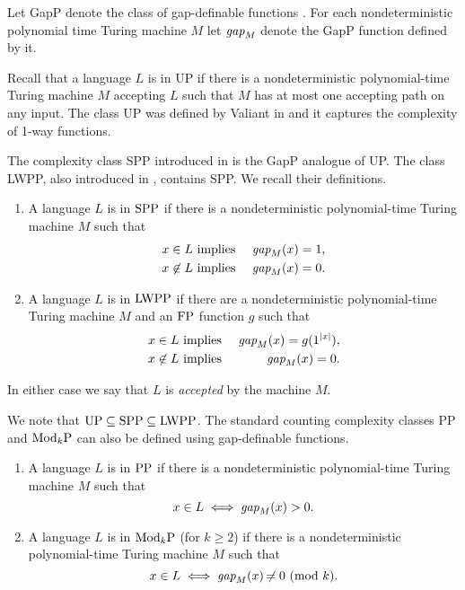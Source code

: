 \documentclass{elsart}
\newcommand{\UP}{\mbox{\rm UP}}
\newcommand{\PP}{\mbox{\rm PP}}
\newcommand{\FP}{\mbox{\rm FP}}
\newcommand{\ModkP}{\mbox{\rm Mod$_k$P}}
\newcommand{\LWPP}{\mbox{\rm LWPP}}
\newcommand{\SPP}{\mbox{\rm SPP}}
\newcommand{\gap}{\mbox{\it gap}}
\begin{document}
Let GapP denote the class of gap-definable functions
\cite{fenner91gapdefinable}. For each nondeterministic polynomial time
Turing machine $M$ let $\gap_M$ denote the GapP function defined by
it.

Recall that a language $L$ is in UP if there is a nondeterministic
polynomial-time Turing machine $M$ accepting $L$ such that $M$ has at
most one accepting path on any input. The class UP was defined by
Valiant in \cite{Val79} and it captures the complexity of 1-way
functions.

The complexity class SPP introduced in \cite{fenner91gapdefinable} is
the GapP analogue of UP. The class LWPP, also introduced in
\cite{fenner91gapdefinable}, contains SPP. We recall their
definitions.

\begin{defn}\mbox{}\label{sppdef}
\begin{enumerate}
\item A language $L$ is in $\SPP$ if there is a nondeterministic
  polynomial-time Turing machine $M$ such that
\begin{eqnarray*}
x\in L & \textrm{ implies } & \gap_M(x)=1,\\
x\not\in L & \textrm{ implies } & \gap_M(x)=0.
\end{eqnarray*}
\item A language $L$ is in $\LWPP$ if there are a nondeterministic
  polynomial-time Turing machine $M$ and an $\FP$ function $g$ such
  that
\begin{eqnarray*}
x\in L & \textrm{ implies } & \gap_M(x)=g(1^{|x|}),\\
x\not\in L & \textrm{ implies } & \gap_M(x)=0.
\end{eqnarray*}
\end{enumerate}
In either case we say that $L$ is {\em accepted} by the machine $M$.
\end{defn}

We note that $\UP\subseteq\SPP\subseteq \LWPP$. The standard counting
complexity classes PP and $\ModkP$ can also be defined using
gap-definable functions.
\begin{defn}{}{\rm\cite{fenner91gapdefinable}}\label{pp-modkp-defs}
\begin{enumerate}
\item A language $L$ is in $\PP$ if there is a nondeterministic
polynomial-time Turing machine $M$ such that
\[
x\in L \iff \gap_M(x)>0.
\]
\item A language $L$ is in $\ModkP$ (for $k\geq 2$) if there is a
  nondeterministic polynomial-time Turing machine $M$ such that
\[
x\in L \iff \gap_M(x)\neq 0~(\textrm{mod}~k).
\]
\end{enumerate}
\end{defn}
\end{document}
